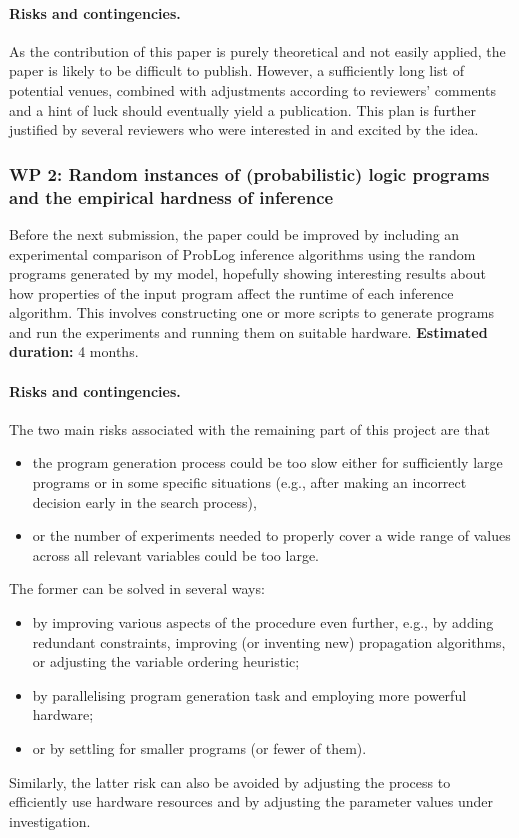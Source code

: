 \documentclass{article}
\begin{document}
\paragraph{Risks and contingencies.} As the contribution of this paper is purely
theoretical and not easily applied, the paper is likely to be difficult to
publish. However, a sufficiently long list of potential venues, combined with
adjustments according to reviewers' comments and a hint of luck should
eventually yield a publication. This plan is further justified by several
reviewers who were interested in and excited by the idea.

\subsubsection{WP 2: Random instances of (probabilistic) logic programs and the
  empirical hardness of inference}

Before the next submission, the paper could be improved by including an
experimental comparison of ProbLog inference algorithms using the random
programs generated by my model, hopefully showing interesting results about how
properties of the input program affect the runtime of each inference algorithm.
This involves constructing one or more scripts to generate programs and run the
experiments and running them on suitable hardware. {\bf Estimated duration:} 4
months.

\paragraph{Risks and contingencies.} The two main risks associated with the
remaining part of this project are that
\begin{itemize}
\item the program generation process could be too slow either for sufficiently
  large programs or in some specific situations (e.g., after making an incorrect
  decision early in the search process),
\item or the number of experiments needed to properly cover a wide range of
  values across all relevant variables could be too large.
\end{itemize}
The former can be solved in several ways:
\begin{itemize}
\item by improving various aspects of the procedure even further, e.g., by
  adding redundant constraints, improving (or inventing new) propagation
  algorithms, or adjusting the variable ordering heuristic;
\item by parallelising program generation task and employing more powerful
  hardware;
\item or by settling for smaller programs (or fewer of them).
\end{itemize}
Similarly, the latter risk can also be avoided by adjusting the process to
efficiently use hardware resources and by adjusting the parameter values under
investigation.
\end{document}
